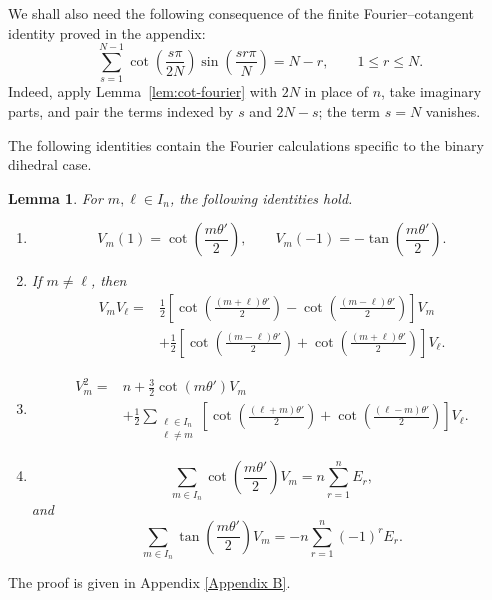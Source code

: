 \documentclass[a4paper,reqno]{amsart}
\theoremstyle{plain} %
\newtheorem{lmm}[thm]{Lemma}
\theoremstyle{definition} %
\theoremstyle{remark} %
\newcommand{\1}{\mathds{1}}   %
\begin{document}
We shall also need the following consequence of the finite
Fourier--cotangent identity proved in the appendix:
\begin{equation}\label{eq:D-cotangent-sum}
\sum_{s=1}^{N-1}
\cot\left(\frac{s\pi}{2N}\right)
\sin\left(\frac{sr\pi}{N}\right)
=
N-r,
\qquad
1\le r\le N.
\end{equation}
Indeed, apply Lemma~\ref{lem:cot-fourier} with \(2N\) in place
of \(n\), take imaginary parts, and pair the terms indexed by
\(s\) and \(2N-s\); the term $s=N$ vanishes.

The following identities contain the Fourier calculations
specific to the binary dihedral case.

\begin{lmm}\label{lem:D-Fourier-identities}
For \(m,\ell\in I_n\), the following identities hold.

\begin{enumerate}
\item[\rm(i)]
\[
V_m(1)
=
\cot\left(\frac{m\theta'}{2}\right),
\qquad
V_m(-1)
=
-\tan\left(\frac{m\theta'}{2}\right).
\]

\item[\rm(ii)]
If \(m\ne\ell\), then
\begin{align}
V_mV_\ell
={}&
\frac12
\left[
\cot\left(\frac{(m+\ell)\theta'}{2}\right)
-
\cot\left(\frac{(m-\ell)\theta'}{2}\right)
\right]V_m
\nonumber\\
&+
\frac12
\left[
\cot\left(\frac{(m-\ell)\theta'}{2}\right)
+
\cot\left(\frac{(m+\ell)\theta'}{2}\right)
\right]V_\ell .
\label{eq:D-VmVl}
\end{align}

\item[\rm(iii)]
\begin{align}
V_m^2
={}&
n
+
\frac32\cot(m\theta')V_m
\nonumber\\
&+
\frac12
\sum_{\substack{\ell\in I_n\\\ell\ne m}}
\left[
\cot\left(\frac{(\ell+m)\theta'}{2}\right)
+
\cot\left(\frac{(\ell-m)\theta'}{2}\right)
\right]V_\ell .
\label{eq:D-Vm-square}
\end{align}

\item[\rm(iv)]
\[
\sum_{m\in I_n}
\cot\left(\frac{m\theta'}{2}\right)V_m
=
n\sum_{r=1}^nE_r,
\]
and
\[
\sum_{m\in I_n}
\tan\left(\frac{m\theta'}{2}\right)V_m
=
-n\sum_{r=1}^n(-1)^rE_r.
\]
\end{enumerate}
\end{lmm}
The proof is given in Appendix \ref{Appendix B}.
\end{document}
